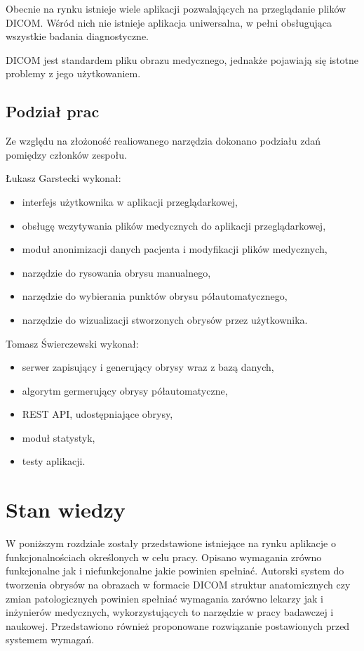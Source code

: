 \documentclass[a4paper,11pt,twoside,openright]{report}
\theoremstyle{definition}
\begin{document}
Obecnie na rynku istnieje wiele aplikacji pozwalających na przeglądanie plików DICOM.
Wśród nich nie istnieje aplikacja uniwersalna, w pełni obsługująca wszystkie badania diagnostyczne.

 DICOM jest standardem pliku obrazu medycznego, jednakże pojawiają się istotne
 problemy z jego użytkowaniem.

\section {Podział prac}

Ze względu na złożoność realiowanego narzędzia dokonano podziału zdań pomiędzy
członków zespołu.

Łukasz Garstecki wykonał:

\begin{itemize}[noitemsep]
\item interfejs użytkownika w aplikacji przeglądarkowej,
\item obsługę wczytywania plików medycznych do aplikacji przeglądarkowej,
\item moduł anonimizacji danych pacjenta i modyfikacji plików medycznych,
\item narzędzie do rysowania obrysu manualnego,
\item narzędzie do wybierania punktów obrysu półautomatycznego,
\item narzędzie do wizualizacji stworzonych obrysów przez użytkownika.
\end{itemize}

Tomasz Świerczewski wykonał:

\begin{itemize}[noitemsep]
\item serwer zapisujący i generujący obrysy wraz z bazą danych,
\item algorytm germerujący obrysy półautomatyczne,
\item REST API, udostępniające obrysy,
\item moduł statystyk,
\item testy aplikacji.
\end{itemize}


\chapter {Stan wiedzy}

W poniższym rozdziale zostały przedstawione istniejące na rynku aplikacje o
funkcjonalnościach określonych w celu pracy. Opisano wymagania zrówno funkcjonalne
jak i niefunkcjonalne jakie powinien spełniać. Autorski system do tworzenia obrysów
na obrazach w formacie DICOM struktur anatomicznych czy zmian patologicznych
powinien spełniać wymagania zarówno lekarzy jak i inżynierów medycznych, wykorzystujących
to narzędzie w pracy badawczej i naukowej. Przedstawiono również proponowane rozwiązanie
postawionych przed systemem wymagań.
\end{document}
